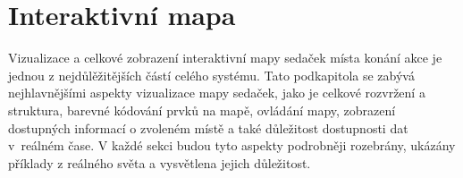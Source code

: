 \section{Interaktivní mapa}
\label{sec:identifikace-interaktivni-mapa}
Vizualizace a celkové zobrazení interaktivní mapy sedaček místa konání akce je jednou z nejdůlěžitějších částí celého systému.
Tato podkapitola se zabývá nejhlavnějšími aspekty vizualizace mapy sedaček, jako je celkové rozvržení a struktura, barevné kódování prvků na mapě, ovládání mapy, zobrazení dostupných informací o zvoleném místě a také důležitost dostupnosti dat v~reálném čase.
V každé sekci budou tyto aspekty podrobněji rozebrány, ukázány příklady z reálného světa a vysvětlena jejich důležitost.


